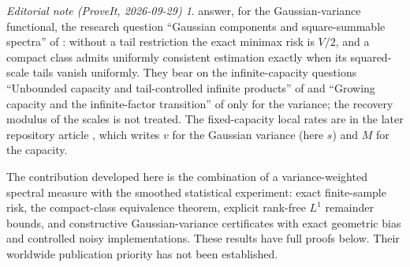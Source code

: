 \documentclass[11pt,letterpaper]{article}
\numberwithin{equation}{section}
\theoremstyle{definition}
\theoremstyle{remark}
\newtheorem*{ednote}{Editorial note (ProveIt, 2026-09-29)}
\begin{document}
\begin{ednote}
 answer, for the Gaussian-variance
functional, the research question ``Gaussian components and square-summable
spectra'' of \cite{recovering}: without a tail restriction the exact minimax
risk is $V/2$, and a compact class admits uniformly consistent estimation
exactly when its squared-scale tails vanish uniformly. They bear on the
infinite-capacity questions ``Unbounded capacity and tail-controlled infinite
products'' of \cite{finite} and ``Growing capacity and the infinite-factor
transition'' of \cite{gaussian} only for the variance; the recovery modulus
of the scales is not treated. The fixed-capacity local rates are in the
later repository article
, which
writes $v$ for the Gaussian variance (here $s$) and $M$ for the capacity.
\end{ednote}

The contribution developed here is the combination of a variance-weighted
spectral measure with the smoothed statistical experiment: exact finite-sample
risk, the compact-class equivalence theorem, explicit rank-free $L^1$
remainder bounds, and constructive Gaussian-variance certificates with exact
geometric bias and controlled noisy implementations. These results have full
proofs below. Their worldwide publication priority has not been established.
\end{document}
